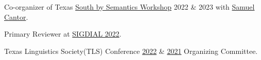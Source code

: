 Co-organizer of Texas \href{https://sites.google.com/utexas.edu/sxsw}{South by Semantics Workshop} 2022 \& 2023 with \href{https://www.cantwolf.com}{Samuel Cantor}.

Primary Reviewer at \href{https://2022.sigdial.org}{SIGDIAL 2022}.

Texas Linguistics Society(TLS) Conference \href{http://tls.ling.utexas.edu/2022/}{2022} \& \href{http://tls.ling.utexas.edu/2021/}{2021} Organizing Committee.
